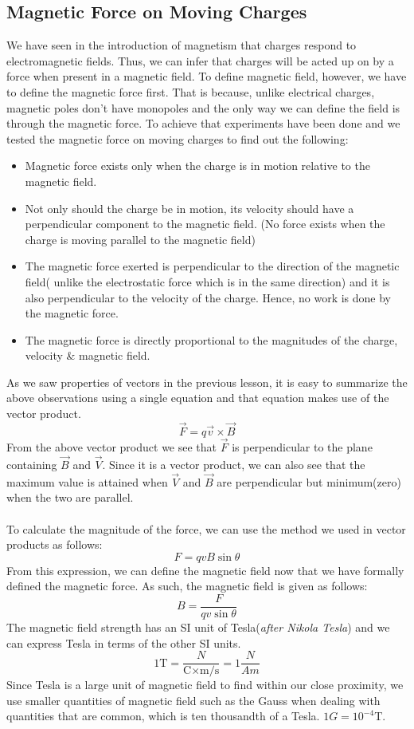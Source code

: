 \documentclass[9pt]{article}
\begin{document}
	\subsection*{Magnetic Force on Moving Charges}
	We have seen in the introduction of magnetism that charges respond to electromagnetic fields. Thus, we can infer that charges will be acted up on by a force when present in a magnetic field.	To define magnetic field, however, we have to define the magnetic force first. That is because, unlike electrical charges, magnetic poles don't have monopoles and the only way we can define the field is through the magnetic force. To achieve that experiments have been done and we tested the magnetic force on moving charges to find out the following:
	\begin{itemize}
		\item Magnetic force exists only when the charge is in motion relative to the magnetic field.
		\item Not only should the charge be in motion, its velocity should have a perpendicular component to the magnetic field. (No force exists when the charge is moving parallel to the magnetic field)
		\item The magnetic force exerted is perpendicular to the direction of the magnetic field( unlike the electrostatic force which is in the same direction) and it is also perpendicular to the velocity of the charge. Hence, no work is done by the magnetic force.
		\item The magnetic force is directly proportional to the magnitudes of the charge, velocity \& magnetic field.
	\end{itemize}
	As we saw properties of vectors in the previous lesson, it is easy to summarize the above observations using a single equation and that equation makes use of the vector product.
	$$\vec{F}=q\vec{v}\times\vec{B}$$	
	From the above vector product we see that $\vec{F}$ is perpendicular to the plane containing $\vec{B}$ and $\vec{V}$. Since it is a vector product, we can also see that the maximum value is attained when $\vec{V}$ and $\vec{B}$ are perpendicular but minimum(zero) when the two are parallel. \\ \\
	To calculate the magnitude of the force, we can use the method we used in vector products as follows: 
	$$F=qvB\sin\theta$$
	From this expression, we can define the magnetic field now that we have formally defined the magnetic force. As such, the magnetic field is given as follows:
	$$B=\dfrac{F}{qv\sin\theta}$$
	The magnetic field strength has an SI unit of Tesla(\textit{after Nikola Tesla}) and we can express Tesla in terms of the other SI units.
	$$1 \text{T}=\dfrac{N}{\text{C}\times\text{m/s}}=1\dfrac{N}{Am}$$
	Since Tesla is a large unit of magnetic field to find within our close proximity, we use smaller quantities of magnetic field such as the Gauss when dealing with quantities that are common, which is ten thousandth of a Tesla. $1 G = 10^{-4}$T.
\end{document}
